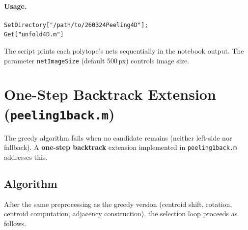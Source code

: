 \documentclass[12pt,a4paper]{article}
\theoremstyle{definition}
\begin{document}
\paragraph{Usage.}
\begin{verbatim}
SetDirectory["/path/to/260324Peeling4D"];
Get["unfold4D.m"]
\end{verbatim}
The script prints each polytope's nets sequentially in the notebook output.
The parameter \texttt{netImageSize} (default 500\,px) controls image size.


\section{One-Step Backtrack Extension (\texttt{peeling1back.m})}

The greedy algorithm fails when no candidate remains (neither left-side nor
fallback).
A \textbf{one-step backtrack} extension implemented in
\texttt{peeling1back.m} addresses this.

\subsection{Algorithm}

After the same preprocessing as the greedy version (centroid shift, rotation,
centroid computation, adjacency construction), the selection loop proceeds
as follows.
\end{document}

